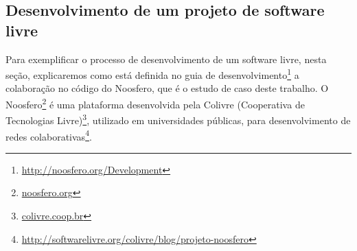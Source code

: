 \begin{comment}
Umas das grandes conquistas de Stallman e da \emph{Fre Software Foudation} (FSF), 
principal organização dedicada a produção e à divulgação do software livre, 
foram o projeto GNU\footnote{\url{www.gnu.org}} e a licença de software \textit{General Public License} (GPL).
%
O projeto GNU consistiu em desenvolver um sistema operacional baseado no sistema 
Unix, porém livre de código proprietário, proporcionando aos usuários do Unix um 
sistema totalmente compatível com o Unix, com seu código disponível para todos e 
a liberdade de buscar suporte e personalizações da forma que quisessem.
%
Com o GNU, também foi desenvolvida a GPL, licença que dá amparo legal e formaliza 
a ideologia de software livre, amplamente utilizada pelos software livres.
%
Em paralelo ao desenvolvimento do GNU, sem relação alguma com o projeto da FSF,
o finlandês Linus Torvalds iniciou o desenvolvimento de um núcleo de sistema operacional também baseado no Unix e deu o nome do núcleo Linux (\emph{Linux Kernel}), disponibilizando-o pela licença GNU GPL.
%
Assim, como o fato do projeto GNU ainda não ter seu núcleo pronto, foi promovida a integração entre GNU e Linux, resultando no sistema operacional GNU/Linux, amplamente utilizado até os dias de hoje, configurando o sucesso do processo empírico e colaborativo dos projetos de software livre.

\end{comment}

\subsection{Desenvolvimento de um projeto de software livre}
\label{sec:dev-noosfero}


Para exemplificar o processo de desenvolvimento de um software livre,
nesta seção, explicaremos como está definida no guia de desenvolvimento\footnote{\url{http://noosfero.org/Development}} a colaboração no código do Noosfero, que é o estudo de caso deste trabalho.
%
O Noosfero\footnote{\url{noosfero.org}} é uma plataforma desenvolvida pela Colivre (Cooperativa de Tecnologias Livre)\footnote{\url{colivre.coop.br}}, utilizado em universidades públicas, para desenvolvimento de redes colaborativas\footnote{\url{http://softwarelivre.org/colivre/blog/projeto-noosfero}}.

